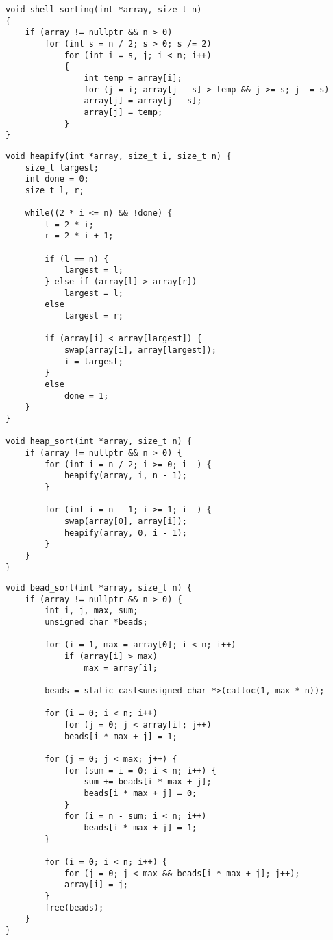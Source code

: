 \clearpage

\begin{lstlisting}[label=lst:shell,caption=Функция сортировки методом Шелла]
void shell_sorting(int *array, size_t n)
{
	if (array != nullptr && n > 0)
		for (int s = n / 2; s > 0; s /= 2)
			for (int i = s, j; i < n; i++)
			{
				int temp = array[i];
				for (j = i; array[j - s] > temp && j >= s; j -= s)
				array[j] = array[j - s];
				array[j] = temp;
			}
}
\end{lstlisting}

\clearpage

\begin{lstlisting}[label=lst:heap,caption=Функция пирамидальной сортировки]
void heapify(int *array, size_t i, size_t n) {
	size_t largest;
	int done = 0;
	size_t l, r;
	
	while((2 * i <= n) && !done) {
		l = 2 * i;
		r = 2 * i + 1;
		
		if (l == n) {
			largest = l;
		} else if (array[l] > array[r])
			largest = l;
		else
			largest = r;
		
		if (array[i] < array[largest]) {
			swap(array[i], array[largest]);
			i = largest;
		}
		else
			done = 1;
	}
}

void heap_sort(int *array, size_t n) {
	if (array != nullptr && n > 0) {
		for (int i = n / 2; i >= 0; i--) {
			heapify(array, i, n - 1);
		}
		
		for (int i = n - 1; i >= 1; i--) {
			swap(array[0], array[i]);
			heapify(array, 0, i - 1);
		}
	}
}
\end{lstlisting}

\clearpage

\begin{lstlisting}[label=lst:bead,caption=Функция сортировки бусинами]
void bead_sort(int *array, size_t n) {
	if (array != nullptr && n > 0) {
		int i, j, max, sum;
		unsigned char *beads;
		
		for (i = 1, max = array[0]; i < n; i++)
			if (array[i] > max)
				max = array[i];
		
		beads = static_cast<unsigned char *>(calloc(1, max * n));
		
		for (i = 0; i < n; i++)
			for (j = 0; j < array[i]; j++)
			beads[i * max + j] = 1;
		
		for (j = 0; j < max; j++) {
			for (sum = i = 0; i < n; i++) {
				sum += beads[i * max + j];
				beads[i * max + j] = 0;
			}
			for (i = n - sum; i < n; i++)
				beads[i * max + j] = 1;
		}
		
		for (i = 0; i < n; i++) {
			for (j = 0; j < max && beads[i * max + j]; j++);
			array[i] = j;
		}
		free(beads);
	}
}
\end{lstlisting}

